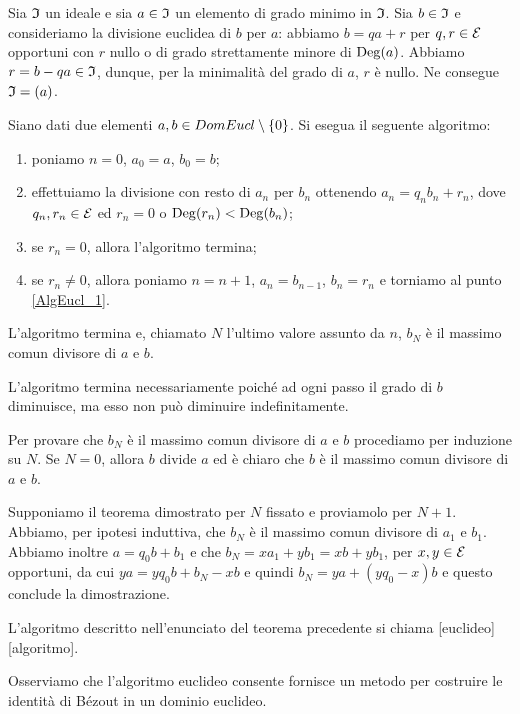 \Proof Sia $\mathfrak{I}$ un ideale e sia $a \in \mathfrak{I}$ un elemento di grado minimo in $\mathfrak{I}$. Sia $b \in \mathfrak{I}$ e consideriamo la divisione euclidea di $b$ per $a$: abbiamo $b = qa + r$ per $q, r \in \mathcal{E}$ opportuni con $r$ nullo o di grado strettamente minore di $\operatorname{Deg}(a)$. Abbiamo $r = b - qa \in \mathfrak{I}$, dunque, per la minimalit\`a del grado di $a$, $r$ \`e nullo. Ne consegue $\mathfrak{I} = \left ( a \right )$.\EndProof
\begin{Theorem}
	Siano dati due elementi $a, b \in DomEucl \setminus \lbrace 0 \rbrace$. Si esegua il seguente algoritmo:
	\begin{enumerate}
		\item poniamo $n = 0$, $a_0 = a$, $b_0 = b$;
		\item effettuiamo la divisione con resto di $a_n$ per $b_n$ ottenendo $a_n = q_nb_n + r_n$, dove $q_n, r_n \in \mathcal{E}$ ed $r_n = 0$ o $\operatorname{Deg}(r_n) < \operatorname{Deg}(b_n)$;\label{AlgEucl_1}
		\item se $r_n = 0$, allora l'algoritmo termina;
		\item se $r_n \neq 0$, allora poniamo $n = n + 1$, $a_n = b_{n - 1}$, $b_n = r_n$ e torniamo al punto \ref{AlgEucl_1}.
	\end{enumerate}
	L'algoritmo termina e, chiamato $N$ l'ultimo valore assunto da $n$, $b_N$ \`e il massimo comun divisore di $a$ e $b$.
\end{Theorem}
\Proof L'algoritmo termina necessariamente poich\'e ad ogni passo il grado di $b$ diminuisce, ma esso non pu\`o diminuire indefinitamente.
\par Per provare che $b_N$ \`e il massimo comun divisore di $a$ e $b$ procediamo per induzione su $N$. Se $N = 0$, allora $b$ divide $a$ ed \`e chiaro che $b$ \`e il massimo comun divisore di $a$ e $b$.
\par Supponiamo il teorema dimostrato per $N$ fissato e proviamolo per $N + 1$. Abbiamo, per ipotesi induttiva, che $b_N$ \`e il massimo comun divisore di $a_1$ e $b_1$. Abbiamo inoltre $a = q_0b + b_1$ e che $b_N = xa_1 + yb_1 = xb + yb_1$, per $x, y \in \mathcal{E}$ opportuni, da cui $ya = yq_0b + b_N - xb$ e quindi $b_N = ya + (yq_0 -x)b$ e questo conclude la dimostrazione. \EndProof
\begin{Definition}
	L'algoritmo descritto nell'enunciato del teorema precedente si chiama [euclideo][algoritmo].
\end{Definition}
\par Osserviamo che l'algoritmo euclideo consente fornisce un metodo per costruire le identit\`a di B\'ezout in un dominio euclideo.
